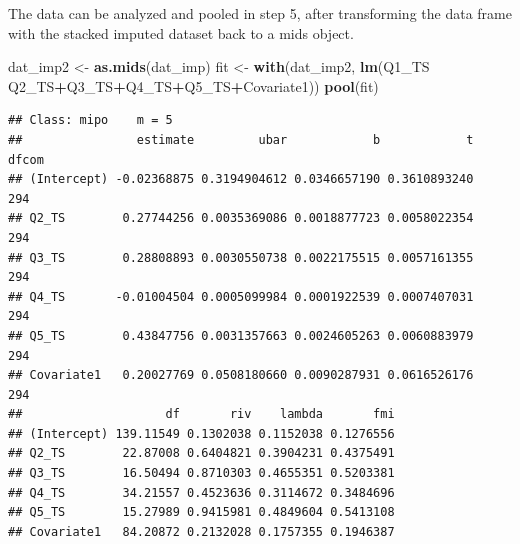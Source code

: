 \documentclass[]{book}
\newenvironment{Shaded}{\begin{snugshade}}{\end{snugshade}}
\newcommand{\KeywordTok}[1]{\textcolor[rgb]{0.13,0.29,0.53}{\textbf{#1}}}
\newcommand{\DataTypeTok}[1]{\textcolor[rgb]{0.13,0.29,0.53}{#1}}
\newcommand{\StringTok}[1]{\textcolor[rgb]{0.31,0.60,0.02}{#1}}
\newcommand{\OtherTok}[1]{\textcolor[rgb]{0.56,0.35,0.01}{#1}}
\newcommand{\OperatorTok}[1]{\textcolor[rgb]{0.81,0.36,0.00}{\textbf{#1}}}
\newcommand{\NormalTok}[1]{#1}
\begin{document}
\begin{Shaded}
\end{Shaded}

The data can be analyzed and pooled in step 5, after transforming the
data frame with the stacked imputed dataset back to a mids object.

\begin{Shaded}
\begin{Highlighting}[]
\NormalTok{dat_imp2 <-}\StringTok{ }\KeywordTok{as.mids}\NormalTok{(dat_imp)}
\NormalTok{fit <-}\StringTok{ }\KeywordTok{with}\NormalTok{(dat_imp2, }\KeywordTok{lm}\NormalTok{(Q1_TS}\OperatorTok{~}\StringTok{ }\NormalTok{Q2_TS}\OperatorTok{+}\NormalTok{Q3_TS}\OperatorTok{+}\NormalTok{Q4_TS}\OperatorTok{+}\NormalTok{Q5_TS}\OperatorTok{+}\NormalTok{Covariate1))}
\KeywordTok{pool}\NormalTok{(fit)}
\end{Highlighting}
\end{Shaded}

\begin{verbatim}
## Class: mipo    m = 5 
##                estimate         ubar            b            t dfcom
## (Intercept) -0.02368875 0.3194904612 0.0346657190 0.3610893240   294
## Q2_TS        0.27744256 0.0035369086 0.0018877723 0.0058022354   294
## Q3_TS        0.28808893 0.0030550738 0.0022175515 0.0057161355   294
## Q4_TS       -0.01004504 0.0005099984 0.0001922539 0.0007407031   294
## Q5_TS        0.43847756 0.0031357663 0.0024605263 0.0060883979   294
## Covariate1   0.20027769 0.0508180660 0.0090287931 0.0616526176   294
##                    df       riv    lambda       fmi
## (Intercept) 139.11549 0.1302038 0.1152038 0.1276556
## Q2_TS        22.87008 0.6404821 0.3904231 0.4375491
## Q3_TS        16.50494 0.8710303 0.4655351 0.5203381
## Q4_TS        34.21557 0.4523636 0.3114672 0.3484696
## Q5_TS        15.27989 0.9415981 0.4849604 0.5413108
## Covariate1   84.20872 0.2132028 0.1757355 0.1946387
\end{verbatim}
\end{document}
